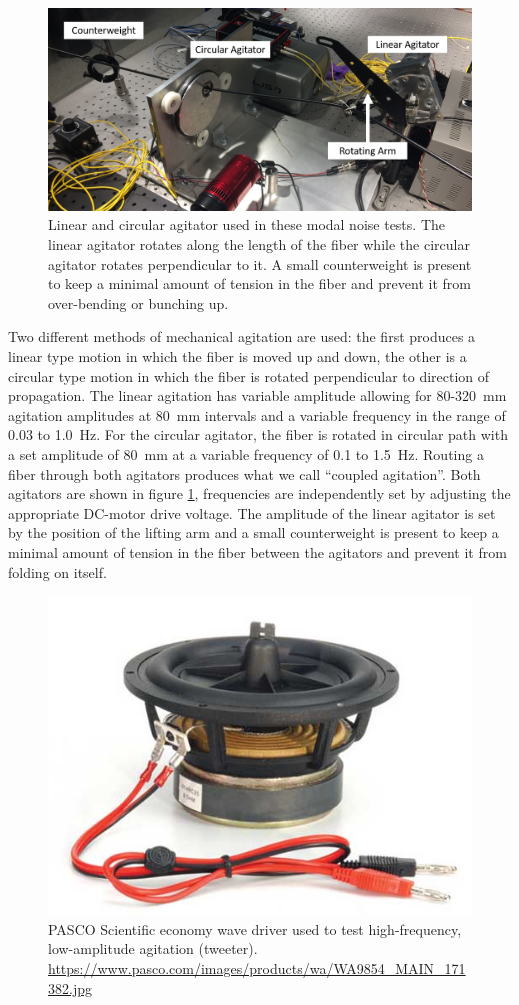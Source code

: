 \documentclass[twocolumn]{emulateapj}
\begin{document}
\begin{figure}
\centering
	\includegraphics[width=\columnwidth]{images/agitators_labelled.png}
	\caption{Linear and circular agitator used in these modal noise tests. The linear agitator rotates along the length of the fiber while the circular agitator rotates perpendicular to it. A small counterweight is present to keep a minimal amount of tension in the fiber and prevent it  from over-bending or bunching up.}
\label{fig:agitators}
\end{figure}

Two different methods of mechanical agitation are used: the first produces a linear type motion in which the fiber is moved up and down, the other is a circular type motion in which the fiber is rotated perpendicular to direction of propagation. The linear agitation has variable amplitude allowing for 80-\SI{320}{\milli\meter} agitation amplitudes at \SI{80}{\milli\meter} intervals and a variable frequency in the range of 0.03 to \SI{1.0}{\hertz}. For the circular agitator, the fiber is rotated in circular path with a set amplitude of \SI{80}{\milli\meter} at a variable frequency of 0.1 to \SI{1.5}{\hertz}. Routing a fiber through both agitators produces what we call ``coupled agitation''.  Both agitators are shown in figure \ref{fig:agitators}, frequencies are independently set by adjusting the appropriate DC-motor drive voltage. The amplitude of the linear agitator is set by the position of the lifting arm and a small counterweight is present to keep a minimal amount of tension in the fiber between the agitators and prevent it from folding on itself.

\begin{figure}
\centering
	\includegraphics[width=0.5\columnwidth]{images/tweeter.jpg}
	\caption{PASCO Scientific economy wave driver used to test high-frequency, low-amplitude agitation (tweeter). \url{https://www.pasco.com/images/products/wa/WA9854_MAIN_171382.jpg}}
\label{fig:tweeter}
\end{figure}
\end{document}
